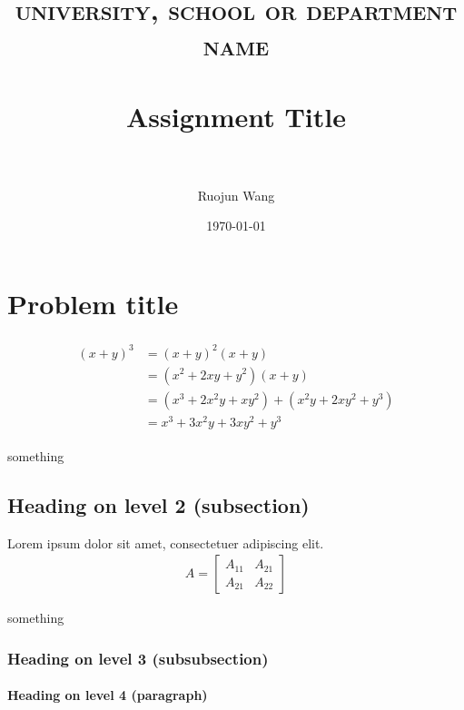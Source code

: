 \documentclass[paper=a4, fontsize=11pt]{scrartcl} %
\title{	
	\normalfont \normalsize 
	\textsc{university, school or department name} \\ [25pt] %
	\horrule{0.5pt} \\[0.4cm] %
	\huge Assignment Title \\ %
	\horrule{2pt} \\[0.5cm] %
}
\author{Ruojun Wang} %
\date{\normalsize\today} %
\numberwithin{equation}{section} %
\numberwithin{figure}{section} %
\numberwithin{table}{section} %
\begin{document}
	
	\maketitle %
	
	
	\section{Problem title}
	
	\lipsum[2] %
	
	\begin{align} 
	\begin{split}
	(x+y)^3 	&= (x+y)^2(x+y)\\
	&=(x^2+2xy+y^2)(x+y)\\
	&=(x^3+2x^2y+xy^2) + (x^2y+2xy^2+y^3)\\
	&=x^3+3x^2y+3xy^2+y^3
	\end{split}					
	\end{align}
	
	something
	
	
	\subsection{Heading on level 2 (subsection)}
	
	Lorem ipsum dolor sit amet, consectetuer adipiscing elit. 
	\begin{align}
	A = 
	\begin{bmatrix}
	A_{11} & A_{21} \\
	A_{21} & A_{22}
	\end{bmatrix}
	\end{align}
	
	something
	
	
	\subsubsection{Heading on level 3 (subsubsection)}
	
	\lipsum[3] %
	
	\paragraph{Heading on level 4 (paragraph)}
	
\end{document}
